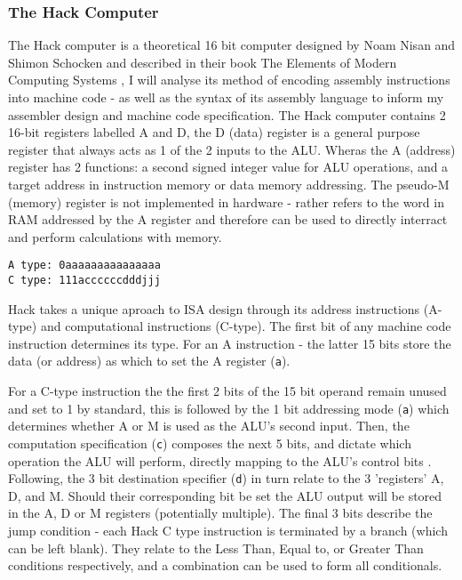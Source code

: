 \subsubsection{The Hack Computer}
The Hack computer is a theoretical 16 bit computer designed by Noam Nisan and Shimon Schocken and described in their book The Elements of Modern Computing Systems \textcite{EOCS}, I will analyse its method of encoding assembly instructions into machine code - as well as the syntax of its assembly language to inform my assembler design and machine code specification. The Hack computer contains 2 16-bit registers labelled A and D, the D (data) register is a general purpose register that always acts as 1 of the 2 inputs to the ALU. Wheras the A (address) register has 2 functions: a second signed integer value for ALU operations, and a target address in instruction memory or data memory addressing. The pseudo-M (memory) register is not implemented in hardware - rather refers to the word in RAM addressed by the A register and therefore can be used to directly interract and perform calculations with memory.
\begin{lstlisting}
A type: 0aaaaaaaaaaaaaaa
C type: 111accccccdddjjj
\end{lstlisting} 
Hack takes a unique aproach to ISA design through its address instructions (A-type) and computational instructions (C-type). The first bit of any machine code instruction determines its type. For an A instruction - the latter 15 bits store the data (or address) as which to set the A register (\texttt{a}). 

For a C-type instruction the the first 2 bits of the 15 bit operand remain unused and set to 1 by standard, this is followed by the 1 bit addressing mode (\texttt{a}) which determines whether A or M is used as the ALU's second input. Then, the computation specification (\texttt{c}) composes the next 5 bits, and dictate which operation the ALU will perform, directly mapping to the ALU's control bits \textcite{EOCS}. Following, the 3 bit destination specifier (\texttt{d}) in turn relate to the 3 'registers' A, D, and M. Should their corresponding bit be set the ALU output will be stored in the A, D or M registers (potentially multiple). The final 3 bits describe the jump condition - each Hack C type instruction is terminated by a branch (which can be left blank). They relate to the Less Than, Equal to, or Greater Than conditions respectively, and a combination can be used to form all conditionals.

\bigskip

